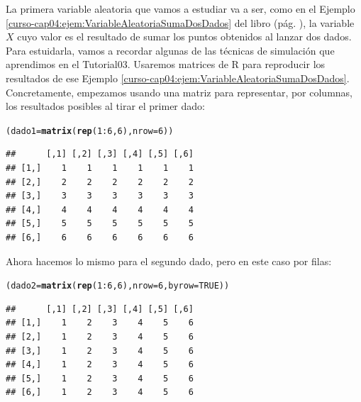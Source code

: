 \documentclass[10pt,a4paper]{article}\usepackage[]{graphicx}\usepackage[]{color}
\makeatletter
\newcommand{\hlnum}[1]{\textcolor[rgb]{0.686,0.059,0.569}{#1}}%
\newcommand{\hlopt}[1]{\textcolor[rgb]{0,0,0}{#1}}%
\newcommand{\hlstd}[1]{\textcolor[rgb]{0.345,0.345,0.345}{#1}}%
\newcommand{\hlkwb}[1]{\textcolor[rgb]{0.69,0.353,0.396}{#1}}%
\newcommand{\hlkwc}[1]{\textcolor[rgb]{0.333,0.667,0.333}{#1}}%
\newcommand{\hlkwd}[1]{\textcolor[rgb]{0.737,0.353,0.396}{\textbf{#1}}}%
\newenvironment{kframe}{%
 \def\at@end@of@kframe{}%
 \ifinner\ifhmode%
  \def\at@end@of@kframe{\end{minipage}}%
  \begin{minipage}{\columnwidth}%
 \fi\fi%
 \def\FrameCommand##1{\hskip\@totalleftmargin \hskip-\fboxsep
 \colorbox{shadecolor}{##1}\hskip-\fboxsep
     \hskip-\linewidth \hskip-\@totalleftmargin \hskip\columnwidth}%
 \MakeFramed {\advance\hsize-\width
   \@totalleftmargin\z@ \linewidth\hsize
   \@setminipage}}%
 {\par\unskip\endMakeFramed%
 \at@end@of@kframe}
\newenvironment{knitrout}{}{} %
\makeatother
\begin{document}
La primera variable aleatoria que vamos a estudiar va a ser, como en el Ejemplo \ref{curso-cap04:ejem:VariableAleatoriaSumaDosDados} del libro (pág. \pageref{curso-cap04:ejem:VariableAleatoriaSumaDosDados}), la variable $X$ cuyo valor es el resultado de sumar los puntos obtenidos al lanzar dos dados. Para estuidarla, vamos a recordar algunas de las técnicas de simulación que aprendimos en el Tutorial03. Usaremos matrices de R para reproducir los resultados de ese Ejemplo \ref{curso-cap04:ejem:VariableAleatoriaSumaDosDados}. Concretamente, empezamos usando una matriz para representar, por columnas, los resultados posibles al tirar el primer dado:
\begin{knitrout}
\color{fgcolor}\begin{kframe}
\begin{alltt}
\hlstd{(dado1} \hlkwb{=} \hlkwd{matrix}\hlstd{(}\hlkwd{rep}\hlstd{(}\hlnum{1}\hlopt{:}\hlnum{6}\hlstd{,}\hlnum{6}\hlstd{),} \hlkwc{nrow} \hlstd{=} \hlnum{6}\hlstd{))}
\end{alltt}
\begin{verbatim}
##      [,1] [,2] [,3] [,4] [,5] [,6]
## [1,]    1    1    1    1    1    1
## [2,]    2    2    2    2    2    2
## [3,]    3    3    3    3    3    3
## [4,]    4    4    4    4    4    4
## [5,]    5    5    5    5    5    5
## [6,]    6    6    6    6    6    6
\end{verbatim}
\end{kframe}
\end{knitrout}
Ahora hacemos lo mismo para el segundo dado, pero en este caso por filas:
\begin{knitrout}
\color{fgcolor}\begin{kframe}
\begin{alltt}
\hlstd{(dado2} \hlkwb{=} \hlkwd{matrix}\hlstd{(}\hlkwd{rep}\hlstd{(}\hlnum{1}\hlopt{:}\hlnum{6}\hlstd{,}\hlnum{6}\hlstd{),} \hlkwc{nrow} \hlstd{=} \hlnum{6}\hlstd{,} \hlkwc{byrow} \hlstd{=} \hlnum{TRUE}\hlstd{))}
\end{alltt}
\begin{verbatim}
##      [,1] [,2] [,3] [,4] [,5] [,6]
## [1,]    1    2    3    4    5    6
## [2,]    1    2    3    4    5    6
## [3,]    1    2    3    4    5    6
## [4,]    1    2    3    4    5    6
## [5,]    1    2    3    4    5    6
## [6,]    1    2    3    4    5    6
\end{verbatim}
\end{kframe}
\end{knitrout}
\end{document}
